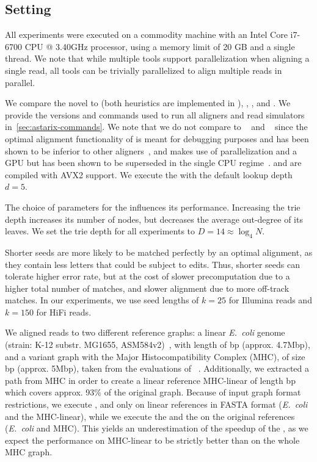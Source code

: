 \subsection{Setting}
%
All experiments were executed on a commodity machine with an Intel Core i7-6700
CPU @ 3.40GHz processor, using a memory limit of 20 GB and a single thread.
%
We note that while multiple tools support parallelization when aligning a single
read, all tools can be trivially parallelized to align multiple reads in
parallel.

%
We compare the novel \seedh to \prefixh (both heuristics are implemented in
\astarix), \graphaligner, \pasgal, and \vargas. We provide the versions and
commands used to run all aligners and read simulators
in~\cref{sec:astarix-commands}. 
%
We note that we do not compare to \vg~\citep{garrison_variation_2018} and
\hga~\citep{feng2021accelerating} since the optimal alignment functionality of
\vg is meant for debugging purposes and has been shown to be inferior to other
aligners~\citep[Tab.~4]{feng2021accelerating}, and \hga makes use of
parallelization and a GPU but has been shown to be superseded in the single CPU
regime~\citep[Fig.~9]{feng2021accelerating}. \pasgal and \vargas are compiled
with AVX2 support. We execute the \prefixh with the default lookup depth $d=5$.

%
The choice of parameters for the \seedh influences its performance.
%
Increasing the trie depth increases its number of nodes, but decreases the
average out-degree of its leaves. We set the trie depth for all experiments to
$D=14 \approx \log_4 N$.

Shorter seeds are more likely to be matched perfectly by an optimal alignment,
as they contain less letters that could be subject to edits. Thus, shorter seeds
can tolerate higher error rate, but at the cost of slower precomputation due to
a higher total number of matches, and slower alignment due to more off-track
matches.
%
In our experiments, we use seed lengths of $k=25$ for Illumina reads and $k=150$
for HiFi reads.

%
We aligned reads to two different reference graphs: a linear \textit{E.~coli}
genome (strain: K-12 substr. MG1655, ASM584v2)~\citep{howe2019ensembl}, with
length of bp (approx. 4.7Mbp), and a variant graph with the
Major Histocompatibility Complex (MHC), of size bp (approx.
5Mbp), taken from the evaluations of \pasgal~\citep{jain_accelerating_2019}.
%
Additionally, we extracted a path from MHC in order to create a linear reference
MHC-linear of length bp which covers approx. 93\% of the
original graph. Because of input graph format restrictions, we execute
\graphaligner, \vargas and \pasgal only on linear references in FASTA format
(\textit{E.~coli} and the MHC-linear), while we execute the \seedh and the
\prefixh on the original references (\textit{E.~coli} and MHC). This yields an
underestimation of the speedup of the \seedh, as we expect the performance on
MHC-linear to be strictly better than on the whole MHC graph.

